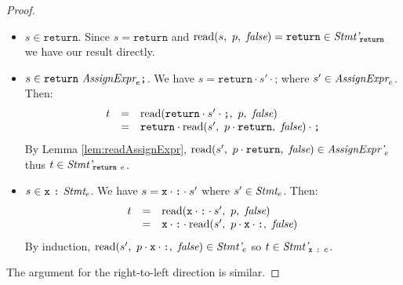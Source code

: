 \documentclass[preprint,10pt]{sigplanconf}
\begin{document}
\begin{proof}
\begin{itemize}
  \item \( s \in \texttt{return} \). Since \( s = \texttt{return} \)
    and \( \textrm{read}(s,~p,~\textit{false}) = \texttt{return} \in
    \textit{Stmt'}_{\texttt{return}} \) we have our result directly.

  \item \( s \in \texttt{return}~ \textit{AssignExpr}_{e} \texttt{;} \).
    We have \( s = \texttt{return}\cdot s' \cdot \texttt{;} \) where
    \( s' \in \textit{AssignExpr}_{e} \). Then:
    \[
    \begin{array}{rcl}
      t &=& \textrm{read}(\texttt{return} \cdot s' \cdot \texttt{;},~p,~\textit{false})
      \\
      &=& \texttt{return}\cdot \textrm{read}(s',~p \cdot \texttt{return},~\textit{false})
      \cdot \texttt{;}
    \end{array}
    \]
    By Lemma \ref{lem:readAssignExpr}, \( \textrm{read}(s',~p
      \cdot \texttt{return},~\textit{false}) \in \textit{AssignExpr'}_{e}
    \) thus \( t \in \textit{Stmt'}_{\texttt{return}~e} \).

  \item \( s \in \texttt{x}~\texttt{:}~\textit{Stmt}_{e} \). We have \( s =
    \texttt{x} \cdot \texttt{:} \cdot s' \) where \( s' \in \textit{Stmt}_{e}
    \). Then:
    \[
    \begin{array}{rcl}
      t &=& \textrm{read}(\texttt{x} \cdot \texttt{:} \cdot s',~p,~\textit{false})
      \\
      &=& \texttt{x} \cdot \texttt{:} \cdot 
      \textrm{read}(s',~
        p \cdot \texttt{x} \cdot \texttt{:}
      ,~\textit{false})
    \end{array}
    \]
    By induction, \( \textrm{read}(s',~p \cdot \texttt{x} \cdot
      \texttt{:},~\textit{false}) \in \textit{Stmt'}_{e} \) so \( t \in
    \textit{Stmt'}_{\texttt{x}~\texttt{:}~e} \).
  \end{itemize}

  The argument for the right-to-left direction is similar.
\end{proof}
\end{document}
